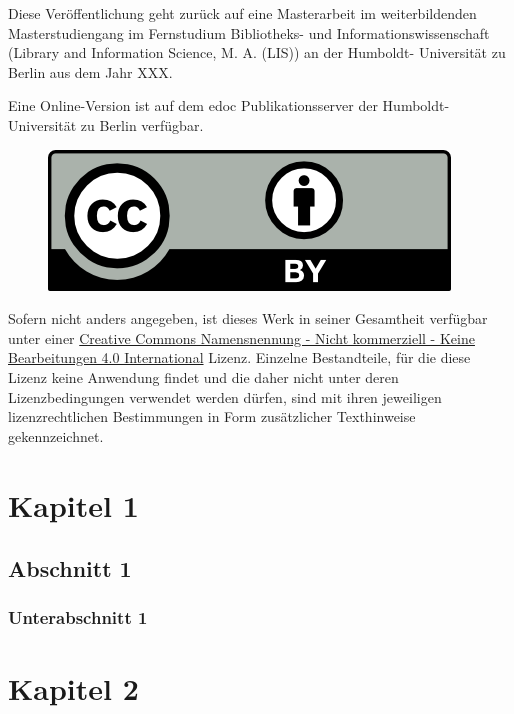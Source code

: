 \documentclass[paper=a4,11pt,twoside,parskip=half-]{scrreprt} %
\begin{document}
Diese Veröffentlichung geht zurück auf eine Masterarbeit im weiterbildenden Ma\-ster\-stu\-di\-en\-gang im Fernstudium Bibliotheks- und Informationswissenschaft (\foreignlanguage{english}{Library and Information Science}, M. A. (LIS)) an der Humboldt- Universität zu Berlin aus dem Jahr XXX.\par
%
%
%
%
Eine Online-Version ist auf dem edoc Publikationsserver der Humboldt-Universität zu Berlin verfügbar. \par

\begin{figure}
\vspace{-.481cm}
\includegraphics[scale=.7]{by.png}
\end{figure}

\small  Sofern nicht anders angegeben, ist dieses Werk in seiner Gesamtheit verfügbar unter einer \href{https://creativecommons.org/licenses/by-nc-nd/4.0/}{\foreignlanguage{english}{Creative Commons} Namensnennung - Nicht kommerziell - Keine Bearbeitungen 4.0 International} Lizenz. %
Einzelne Bestandteile, für die diese Lizenz keine Anwendung findet und die daher nicht unter deren Lizenzbedingungen verwendet werden dürfen, sind mit ihren jeweiligen lizenzrechtlichen Bestimmungen in Form zusätzlicher Texthinweise gekennzeichnet. 
\newpage
\tableofcontents
\chapter{Kapitel 1}
\blindtext
\section{Abschnitt 1}
\blindtext
\subsection{Unterabschnitt 1}
\chapter{Kapitel 2}
\end{document}
